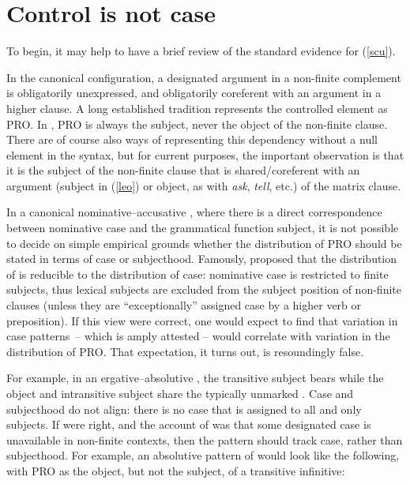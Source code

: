 \documentclass[output=paper]{langsci/langscibook}
\begin{document}
\section{Control is not case}

To begin, it may help to have a brief review of the standard evidence for
(\ref{scu}).

In the canonical  configuration, a designated argument in a non-finite
complement is obligatorily unexpressed, and obligatorily coreferent with an
argument in a higher clause. A long established tradition represents the
controlled element as PRO. In , PRO is always the subject, never the
object of the non-finite clause. There are of course also ways of representing
this dependency without a null element in the syntax, but for current purposes,
the important observation is that it is the subject of the non-finite clause
that is shared/coreferent with an argument (subject in (\ref{leo}) or object,
as with \emph{ask}, \emph{tell}, etc.) of the matrix clause.

\ea \label{leo}	\begin{xlista}
	\end{xlista}
\z

In a canonical nominative--accusative , where there is a direct
correspondence between nominative case and the grammatical function subject, it
is not possible to decide on simple empirical grounds whether the distribution
of PRO should be stated in terms of case or subjecthood. Famously,
\citet{Vergnaud1977,Chomsky1980} proposed that the distribution of  is
reducible to the distribution of case:  nominative case is restricted to
finite subjects, thus lexical subjects are excluded from the subject position
of non-finite clauses (unless they are \enquote{exceptionally} assigned case by
a higher verb or preposition).  If this view were correct, one would expect to
find that variation in case patterns~-- which is amply attested -- would
correlate with variation in the distribution of PRO. That expectation, it turns
out, is resoundingly false.

For example, in an ergative--absolutive , the transitive subject
bears  while the object and intransitive subject share the
typically unmarked . Case and subjecthood do not align:
there is no case that is assigned to all and only subjects. If
\citeauthor{Vergnaud1977} were right, and the account of  was that
some designated case is unavailable in non-finite contexts, then the
 pattern should track case, rather than subjecthood.  For example,
an absolutive pattern of  would look like
the following, with PRO as the object, but not the subject, of a transitive
infinitive:
\end{document}
